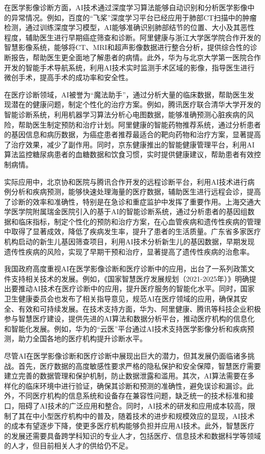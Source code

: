 在医学影像诊断方面，AI技术通过深度学习算法能够自动识别和分析医学影像中的异常情况。例如，百度的“飞桨”深度学习平台已经应用于肺部CT扫描中的肿瘤检测，通过训练深度学习模型，AI能够准确识别肺部结节的位置、大小及其恶性程度，辅助医生进行早期癌症筛查和诊断。阿里健康与浙江大学医学院合作开发的智慧影像系统，能够将CT、MRI和超声影像数据进行整合分析，提供综合性的诊断报告，帮助医生更全面地了解患者的病情。此外，华为与北京大学第一医院合作开发的智能手术导航系统，利用AI技术实时监测手术区域的影像，指导医生进行微创手术，提高手术的成功率和安全性。

在医疗诊断领域，AI被誉为“魔法助手”，通过分析大量的临床数据，帮助医生发现潜在的健康问题，制定个性化的治疗方案。例如，腾讯医疗联合清华大学开发的智能诊断系统，利用机器学习算法分析心电图数据，能够准确预测心脏疾病的风险，帮助医生制定预防和治疗计划。阿里健康的智能药物推荐系统，通过分析患者的基因信息和病历数据，为癌症患者推荐最适合的靶向药物和治疗方案，显著提高了治疗效果，减少了副作用。同时，京东健康推出的智能健康管理平台，利用AI算法监控糖尿病患者的血糖数据和饮食习惯，实时提供健康建议，帮助患者有效控制病情。

实际应用中，北京协和医院与腾讯合作开发的远程诊断平台，利用AI技术进行病例分析和疾病预测，能够快速处理海量的医疗数据，辅助医生进行远程会诊，提高了诊断的效率和准确性，特别是在急诊和重症监护中发挥了重要作用。上海交通大学医学院附属瑞金医院引入的基于AI的智能诊断系统，通过分析患者的基因组数据和临床指标，制定个性化的预防和治疗方案，在心血管疾病和遗传性疾病的管理中取得了显著成效，降低了疾病发生率，提升了患者的生活质量。广东省多家医疗机构启动的新生儿基因筛查项目，利用AI技术分析新生儿的基因数据，早期发现遗传性疾病的风险，实现了早期干预和治疗，显著提高了遗传性疾病的治愈率。

我国政府高度重视AI在医学影像诊断和医疗诊断中的应用，出台了一系列政策文件支持相关技术的发展。例如，《国家智慧医疗发展规划（2021-2025年）》明确提出要推动AI技术在医疗诊断中的应用，提升医疗服务的智能化水平。同时，国家卫生健康委员会也发布了相关指导意见，规范AI在医疗领域的应用，确保其安全、有效和可持续发展。在技术支持方面，华为、阿里健康、腾讯等科技企业积极参与智慧医疗建设，提供先进的AI算法和数据分析平台，推动医疗机构的信息化和智能化发展。例如，华为的“云医”平台通过AI技术支持医学影像分析和疾病预测，助力全国各地的医疗机构提升诊断水平。

尽管AI在医学影像诊断和医疗诊断中展现出巨大的潜力，但其发展仍面临诸多挑战。首先，医疗数据的高度敏感性要求严格的隐私保护和安全保障，智慧医疗需要建立完善的数据管理和保护机制，防止数据泄露和滥用。其次，AI算法需要在多样化的临床环境中进行验证，确保其诊断和预测的准确性，避免误诊和漏诊。此外，不同医疗机构的信息系统和设备存在兼容性问题，缺乏统一的技术标准和接口，阻碍了AI技术的广泛应用和整合。同时，AI技术的研发和应用成本较高，限制了其在中小型医疗机构中的普及，随着技术的进步和规模效应的显现，AI技术的成本有望逐步下降，使更多医疗机构能够负担并应用AI技术。此外，智慧医疗的发展还需要具备跨学科知识的专业人才，包括医疗、信息技术和数据科学等领域的人才，但目前相关人才的供给仍不足。

